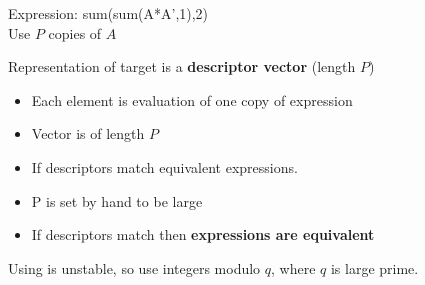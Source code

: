 \documentclass[landscape,a0b]{a0poster_csml_v2}
\begin{document}
\begin{poster}
\begin{PosterColumn}
Expression: sum(sum(A*A’,1),2) \\
Use $P$ copies of $A$


Representation of target is a {\bf descriptor vector} (length $P$)
\begin{itemize}
  \item Each element is evaluation of one copy of expression
  \item Vector is of length $P$
  \item If descriptors match equivalent expressions.
  \item P is set by hand to be large
  \item If descriptors match then {\bf expressions are equivalent}
\end{itemize}

Using is unstable, so use      
integers modulo $q$, where $q$ is large prime.


\end{PosterColumn}
\begin{PosterColumn} 



\end{PosterColumn}
\end{poster}
\end{document}

